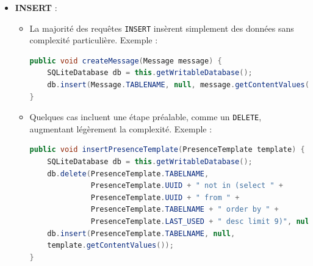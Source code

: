 \documentclass[a4paper,11pt]{article}
\begin{document}
\begin{itemize}
    \item \textbf{INSERT} :
    \begin{itemize}
        \item La majorité des requêtes \texttt{INSERT} insèrent simplement des données sans complexité particulière. Exemple :
        \begin{lstlisting}[language=Java]
public void createMessage(Message message) {
    SQLiteDatabase db = this.getWritableDatabase();
    db.insert(Message.TABLENAME, null, message.getContentValues());
}
        \end{lstlisting}
        \item Quelques cas incluent une étape préalable, comme un \texttt{DELETE}, augmentant légèrement la complexité. Exemple :
        \begin{lstlisting}[language=Java]
public void insertPresenceTemplate(PresenceTemplate template) {
    SQLiteDatabase db = this.getWritableDatabase();
    db.delete(PresenceTemplate.TABELNAME, 
              PresenceTemplate.UUID + " not in (select " + 
              PresenceTemplate.UUID + " from " + 
              PresenceTemplate.TABELNAME + " order by " + 
              PresenceTemplate.LAST_USED + " desc limit 9)", null);
    db.insert(PresenceTemplate.TABELNAME, null, 
    template.getContentValues());
}
        \end{lstlisting}
    \end{itemize}
    

\end{itemize}
\end{document}

